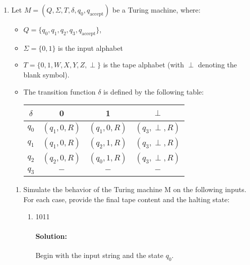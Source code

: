 \documentclass{article}
\begin{document}
\begin{enumerate} 

    \item Let $M=(Q,\Sigma,T,\delta,q_0,q_{\text{accept}})$ be a Turing machine, where:
        \begin{itemize}
            \item[] $Q=\{q_0,q_1,q_2,q_3,q_{\text{accept}}\} $,
            \item[] $\Sigma=\{0,1\} $ is the input alphabet
            \item[] $T=\{0,1,W,X,Y,Z,\perp \} $ is the tape alphabet (with $\perp $ denoting the blank symbol).
            \item[] The transition function $\delta$ is defined by the following table:
                    \centering
                    \begin{tabular}{c|c|c|c}
                    $\delta$ & 0 & 1 & $\perp $ \\
                    \hline
                    $q_0$ &$(q_1,0,R)$ &$(q_1,0,R)$ &$(q_3,\perp ,R)$ \\
                    $q_1$ &$(q_1,0,R)$ &$(q_2,1,R)$ &$(q_3,\perp ,R)$ \\
                    $q_2$ &$(q_2,0,R)$ &$(q_0,1,R)$ &$(q_3,\perp ,R)$ \\
                    $q_3$ &$-$ &$-$ &$-$ \\
                    \end{tabular}
        \end{itemize}

        \begin{enumerate}
            \item Simulate the behavior of the Turing machine M on the following inputs. For each case, provide the final tape content and the halting state:
            \begin{enumerate}
                \item  1011
                    \paragraph{Solution: } Begin with the input string and the state $q_0$. 

                    \begin{center}
                        \centering


\end{center}
\end{enumerate}
\end{enumerate}
\end{enumerate}
\end{document}
